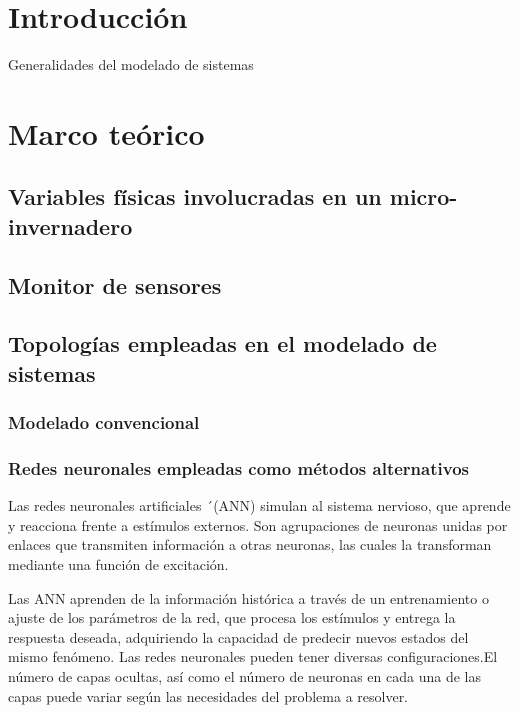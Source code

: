\nonstopmode
 

 
\section{Introducción}

Generalidades del modelado de sistemas


\section{Marco teórico} 
\subsection{Variables físicas involucradas en un micro-invernadero} 

\subsection{Monitor de sensores}

\subsection{Topologías empleadas en el modelado de sistemas}
\subsubsection{Modelado convencional}

\subsubsection{Redes neuronales empleadas como métodos alternativos}
Las redes neuronales artificiales ´(ANN) simulan al  sistema nervioso, que
aprende y reacciona frente a estímulos externos. Son agrupaciones de neuronas
unidas por enlaces que transmiten información a otras neuronas, las cuales la
transforman mediante una función de  excitación. \par Las ANN aprenden de la
información histórica a través de un entrenamiento o ajuste de los parámetros
de la red, que procesa los estímulos y entrega la respuesta deseada,
adquiriendo la capacidad de predecir nuevos estados del mismo fenómeno. Las
redes neuronales pueden tener diversas configuraciones.El número de capas
ocultas, así como el número de neuronas en cada una de las capas puede variar
según las necesidades del problema a resolver. \cite{brahm2003disminucion}

